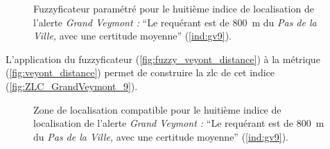 
\begin{figure}
  \centering 
  \caption{Fuzzyficateur \protect{} paramétré pour
    le huitième indice de localisation de l'alerte \emph{Grand Veymont
      :} \enquote{Le requérant est
      \protect{} de \SI{800}{\meter}
      du \emph{Pas de la Ville,} avec une certitude moyenne}
    (\ref{ind:gv9}).}
  \label{fig:fuzzy_veyont_distance}
\end{figure}

L’application du fuzzyficateur (\autoref{fig:fuzzy_veyont_distance}) à
la métrique (\autoref{fig:veyont_distance}) permet de construire la
\ac{zlc} de cet indice (\autoref{fig:ZLC_GrandVeymont_9}).



\begin{figure}
  \centering
  
  \caption{Zone de localisation compatible pour le huitième indice de
    localisation de l'alerte \emph{Grand Veymont :} \enquote{Le
      requérant est \protect{} de
      \SI{800}{\meter} du \emph{Pas de la Ville,} avec une certitude
      moyenne} (\ref{ind:gv9}).}
  \label{fig:ZLC_GrandVeymont_9}
\end{figure}


